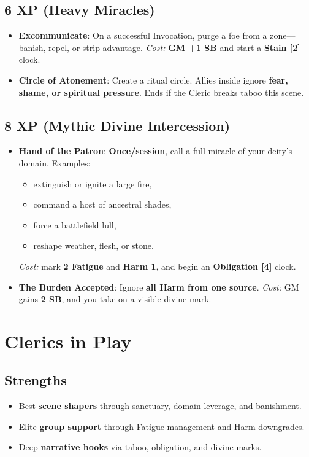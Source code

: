 \documentclass[11pt]{book}
\begin{document}
\subsection*{6 XP (Heavy Miracles)}
\begin{itemize}
  \item \textbf{Excommunicate}:  
    On a successful Invocation, purge a foe from a zone---banish, repel, or strip advantage.  
    \emph{Cost:} \textbf{GM +1 SB} and start a \textbf{Stain [2]} clock.
  \item \textbf{Circle of Atonement}:  
    Create a ritual circle.  
    Allies inside ignore \textbf{fear, shame, or spiritual pressure}.  
    Ends if the Cleric breaks taboo this scene.
\end{itemize}

\subsection*{8 XP (Mythic Divine Intercession)}
\begin{itemize}
  \item \textbf{Hand of the Patron}:  
    \textbf{Once/session}, call a full miracle of your deity's domain.  
    Examples:  
    \begin{itemize}
      \item extinguish or ignite a large fire,  
      \item command a host of ancestral shades,  
      \item force a battlefield lull,  
      \item reshape weather, flesh, or stone.  
    \end{itemize}
    \emph{Cost:} mark \textbf{2 Fatigue} and \textbf{Harm 1}, and begin an \textbf{Obligation [4]} clock.
  \item \textbf{The Burden Accepted}:  
    Ignore \textbf{all Harm from one source}.  
    \emph{Cost:} GM gains \textbf{2 SB}, and you take on a visible divine mark.
\end{itemize}

\section{Clerics in Play}

\subsection{Strengths}
\begin{itemize}
  \item Best \textbf{scene shapers} through sanctuary, domain leverage, and banishment.
  \item Elite \textbf{group support} through Fatigue management and Harm downgrades.
  \item Deep \textbf{narrative hooks} via taboo, obligation, and divine marks.
\end{itemize}
\end{document}
